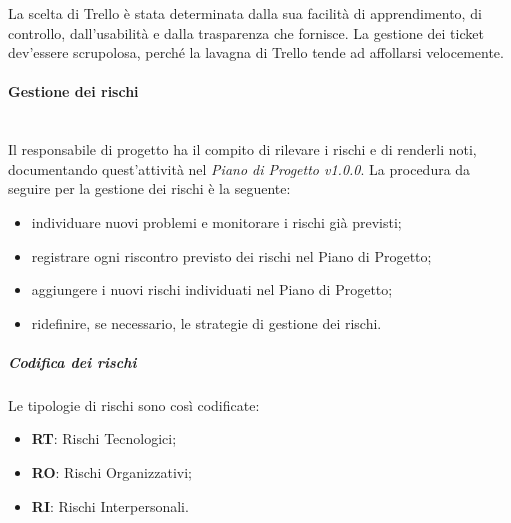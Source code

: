 			La scelta di Trello è stata determinata dalla sua facilità di apprendimento, di controllo, dall'usabilità e dalla trasparenza che fornisce. La gestione dei ticket dev'essere scrupolosa, perché la lavagna di Trello tende ad affollarsi velocemente.

			\paragraph{Gestione dei rischi} \mbox{}\\
			Il responsabile di progetto ha il compito di rilevare i rischi e di renderli noti, documentando quest'attività nel \textit{Piano di Progetto v1.0.0}. La procedura da seguire per la gestione dei rischi è la seguente:
			\begin{itemize}
				\item individuare nuovi problemi e monitorare i rischi già previsti;
				\item registrare ogni riscontro previsto dei rischi nel Piano di Progetto;
				\item aggiungere i nuovi rischi individuati nel Piano di Progetto;
				\item ridefinire, se necessario, le strategie di gestione dei rischi.

			\end{itemize}
				\subparagraph{Codifica dei rischi}
				Le tipologie di rischi sono così codificate:
				\begin{itemize}
					\item \textbf{RT}: Rischi Tecnologici;
					\item \textbf{RO}: Rischi Organizzativi;
					\item \textbf{RI}: Rischi Interpersonali.
				\end{itemize}

